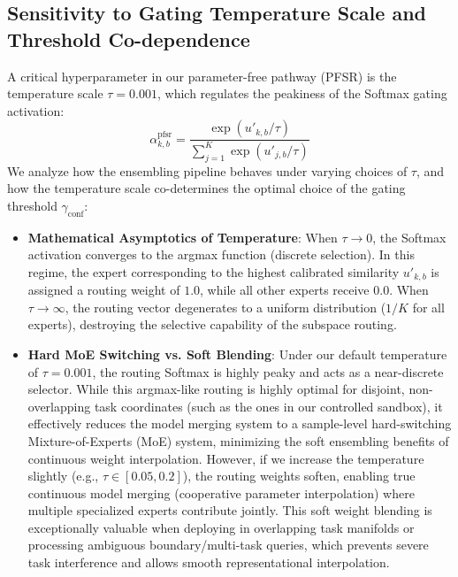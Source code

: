 \documentclass{article}
\theoremstyle{plain}
\theoremstyle{definition}
\theoremstyle{remark}
\begin{document}
\subsection{Sensitivity to Gating Temperature Scale and Threshold Co-dependence}
A critical hyperparameter in our parameter-free pathway (PFSR) is the temperature scale $\tau = 0.001$, which regulates the peakiness of the Softmax gating activation:
\begin{equation}
\alpha^{\text{pfsr}}_{k, b} = \frac{\exp(u'_{k, b} / \tau)}{\sum_{j=1}^K \exp(u'_{j, b} / \tau)}
\end{equation}
We analyze how the ensembling pipeline behaves under varying choices of $\tau$, and how the temperature scale co-determines the optimal choice of the gating threshold $\gamma_{\text{conf}}$:
\begin{itemize}
    \item \textbf{Mathematical Asymptotics of Temperature}: When $\tau \to 0$, the Softmax activation converges to the argmax function (discrete selection). In this regime, the expert corresponding to the highest calibrated similarity $u'_{k, b}$ is assigned a routing weight of $1.0$, while all other experts receive $0.0$. When $\tau \to \infty$, the routing vector degenerates to a uniform distribution ($1/K$ for all experts), destroying the selective capability of the subspace routing.
    \item \textbf{Hard MoE Switching vs. Soft Blending}: Under our default temperature of $\tau = 0.001$, the routing Softmax is highly peaky and acts as a near-discrete selector. While this argmax-like routing is highly optimal for disjoint, non-overlapping task coordinates (such as the ones in our controlled sandbox), it effectively reduces the model merging system to a sample-level hard-switching Mixture-of-Experts (MoE) system, minimizing the soft ensembling benefits of continuous weight interpolation. However, if we increase the temperature slightly (e.g., $\tau \in [0.05, 0.2]$), the routing weights soften, enabling true continuous model merging (cooperative parameter interpolation) where multiple specialized experts contribute jointly. This soft weight blending is exceptionally valuable when deploying in overlapping task manifolds or processing ambiguous boundary/multi-task queries, which prevents severe task interference and allows smooth representational interpolation.

\end{itemize}
\end{document}
